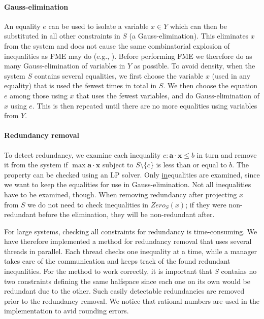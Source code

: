 \documentclass{llncs}
\newcommand{\mi}{\mathit}
\newcommand{\ve}{\mathbf}
\begin{document}
\paragraph{Gauss-elimination} 
An equality $e$ can be used to isolate a variable $x\in Y$ which can then be substituted in all other constraints in $S$ (a Gauss-elimination). This eliminates $x$ from the system and does not cause the same combinatorial explosion of inequalities as FME may do (e.g., \cite{duffin74,simon05}). Before performing FME we therefore do as many Gauss-elimination of variables in $Y$ as possible. To avoid density, when the system $S$ contains several equalities, we first choose the variable $x$ (used in any equality) that is used the fewest times in total in $S$. We then choose the equation $e$ among those using $x$ that uses the fewest variables, and do Gauss-elimination of $x$ using $e$. This is then repeated until there are no more equalities using variables from $Y$.

\paragraph{Redundancy removal} 
To detect redundancy, we examine each inequality $c: \ve{a}\cdot \ve{x}\leq b$ in turn and remove it from the system if $\max \ve{a}\cdot \ve{x}$ subject to $S\setminus\{c\}$ is less than or equal to $b$. The property can be checked using an LP solver. Only \underline{in}equalities are examined, since we want to keep the equalities for use in Gauss-elimination. Not all inequalities have to be examined, though. When removing redundancy after projecting $x$ from $S$ we do not need to check inequalities in $\mi{Zero}_S(x)$; if they were non-redundant before the elimination, they will be non-redundant after.

For large systems, checking all constraints for redundancy is time-consuming. We have therefore implemented a method for redundancy removal that uses several threads in parallel. Each thread checks one inequality at a time, while a manager takes care of the communication and keeps track of the found redundant inequalities. 
For the method to work correctly, it is important that $S$ contains no two constraints defining the same halfspace since each one on its own would be redundant due to the other. Such easily detectable redundancies are removed prior to the redundancy removal. We notice that rational numbers are used in the implementation to avid rounding errors. 
\end{document}
